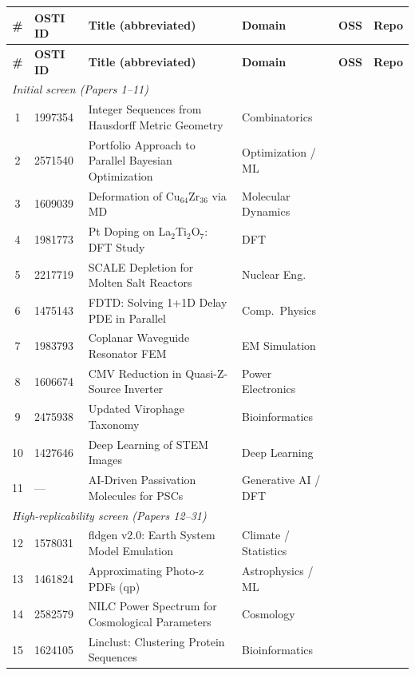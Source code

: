 \documentclass[11pt,letterpaper]{article}
\newcommand{\yes}{\checkmark}
\begin{document}
\begin{landscape}
\begin{longtable}{c l p{6.5cm} l c c}
\toprule
\textbf{\#} & \textbf{OSTI ID} & \textbf{Title (abbreviated)} & \textbf{Domain} & \textbf{OSS} & \textbf{Repo} \\
\midrule
\endfirsthead
\toprule
\textbf{\#} & \textbf{OSTI ID} & \textbf{Title (abbreviated)} & \textbf{Domain} & \textbf{OSS} & \textbf{Repo} \\
\midrule
\endhead
\multicolumn{6}{l}{\textit{Initial screen (Papers 1--11)}} \\
\midrule
1  & 1997354 & Integer Sequences from Hausdorff Metric Geometry & Combinatorics & \yes & \\
2  & 2571540 & Portfolio Approach to Parallel Bayesian Optimization & Optimization / ML & \yes & \\
3  & 1609039 & Deformation of Cu$_{64}$Zr$_{36}$ via MD & Molecular Dynamics & \yes & \\
4  & 1981773 & Pt Doping on La$_2$Ti$_2$O$_7$: DFT Study & DFT & & \\
5  & 2217719 & SCALE Depletion for Molten Salt Reactors & Nuclear Eng. & & \\
6  & 1475143 & FDTD: Solving 1+1D Delay PDE in Parallel & Comp.\ Physics & \yes & \yes \\
7  & 1983793 & Coplanar Waveguide Resonator FEM & EM Simulation & & \yes \\
8  & 1606674 & CMV Reduction in Quasi-Z-Source Inverter & Power Electronics & & \\
9  & 2475938 & Updated Virophage Taxonomy & Bioinformatics & \yes & \yes \\
10 & 1427646 & Deep Learning of STEM Images & Deep Learning & \yes & \\
11 & --- & AI-Driven Passivation Molecules for PSCs & Generative AI / DFT & \yes & \yes \\
\midrule
\multicolumn{6}{l}{\textit{High-replicability screen (Papers 12--31)}} \\
\midrule
12 & 1578031 & fldgen v2.0: Earth System Model Emulation & Climate / Statistics & \yes & \yes \\
13 & 1461824 & Approximating Photo-z PDFs (qp) & Astrophysics / ML & \yes & \yes \\
14 & 2582579 & NILC Power Spectrum for Cosmological Parameters & Cosmology & \yes & \yes \\
15 & 1624105 & Linclust: Clustering Protein Sequences & Bioinformatics & \yes & \yes \\

\end{longtable}
\end{landscape}
\end{document}
